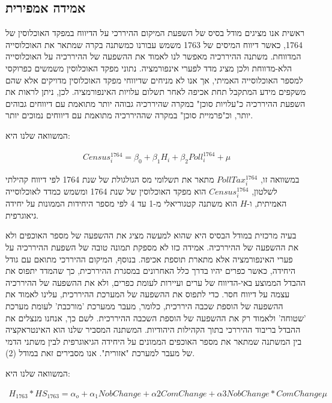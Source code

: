 \subsection{אמידה אמפירית}

ראשית אנו מציגים מודל בסיס של השפעת המיקום ההיררכי על הדיווח במפקד האוכלוסין של 1764, כאשר דיווח המיסים של 1763 משמש עבורנו כמשתנה בקרה שמתאר את האוכלוסייה המדווחת. משתנה ההיררכיה מאפשר לנו לאמוד את ההשפעה של ההיררכיה על האוכלוסייה הלא-מדווחת ולכן מציג מדד לפערי אינפורמציה. נתוני מפקד האוכלוסין משמשים כפרוקסי למספר האוכלוסייה האמיתי, אך אנו לא מניחים שדיווחי מפקד האוכלוסין מדויקים אלא שהם משקפים מידע המתקבל תחת אכיפה לאחר תשלום עלויות האינפורמציה. לכן, ניתן לראות את השפעת ההיררכיה כ"עלויות סוכן" במקרה שהיררכיה גבוהה יותר מתואמת עם דיווחים גבוהים יותר, וכ"פרמיית סוכן" במקרה שההיררכיה מתואמת עם דיווחים נמוכים יותר.

המשוואה שלנו היא:

\begin{align} 	Census_i^{1764} = \beta_0 + \beta_1 H_i + \beta_2 Poll^{1764}_i + \mu \end{align}


במשוואה זו, $PollTax^{1764}_i$ מתאר את תשלומי מס הגולגולת של שנת 1764 לפי דיווח קהילתי לשלטון, $Census^{1764}_i$ הוא מפקד האוכלוסין של שנת 1764 ומשמש כמדד לאוכלוסייה האמיתית, ו-$H$ הוא משתנה קטגוריאלי מ-1 עד 4 לפי מספר היחידות הממונות על יחידה גיאוגרפית.

בעיה מרכזית במודל הבסיס היא שהוא למעשה מציג את ההשפעה של מספר האוכפים ולא את ההשפעה של ההיררכיה. אמידה כזו לא מספקת תמונה טובה של השפעת ההיררכיה על פערי האינפורמציה אלא מתארת תוספת אכיפה. בנוסף, המיקום ההיררכי מתואם עם גודל היחידה, כאשר כפרים יהיו בדרך כלל האחרונים במסגרת ההיררכית, כך שהמדד יתפוס את ההבדל הממוצע באי-הדיווח של ערים ועיירות לעומת כפרים, ולא את ההשפעה של ההיררכיה עצמה על דיווח חסר. כדי לתפוס את ההשפעה של המערכת ההיררכית, עלינו לאמוד את ההשפעה של הוספת שכבה היררכית, כלומר, מעבר ממערכת 'מורכבת' לעומת מערכת 'שטוחה' ולאמוד רק את ההשפעה של הוספת השכבה ההיררכית. לשם כך, אנחנו מנצלים את ההבדל בריבוד ההיררכי בתוך הקהילות היהודיות. המשתנה המסביר שלנו הוא האינטראקציה בין המשתנה שמתאר את מספר האוכפים הממונים על היחידה הגיאוגרפית לבין משתני הדמי של מעבר למערכת "אזורית". אנו מסבירים זאת במודל (2).

המשוואה שלנו היא:

$$ \begin{align} H_{1763}*HS_{1763}= \alpha_o + \alpha_1 NobChange +\alpha2 ComChange +\alpha3 NobChange * ComChange\mu \end{align}$$

